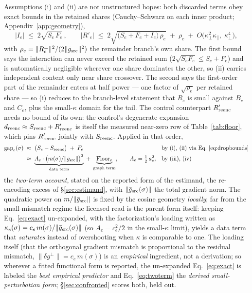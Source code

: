 Assumptions (i) and (ii) are not unstructured hopes: both discarded
terms obey exact bounds in the retained shares
(Cauchy--Schwarz on each inner product; Appendix~\ref{app:geometry}),
\begin{equation}
|I_e| \;\le\; 2\sqrt{S_e\,F_e}\,,
\qquad
\big|R'_e\big| \;\le\; 2\sqrt{\big(S_e + F_e + I_e\big)\,\rho_e}
\;+\; \rho_e
\;+\; O\big(\kappa_\perp^2\kappa_\parallel,\; \kappa_\perp^4\big),
\label{eq:dropbounds}
\end{equation}
with $\rho_e = \|R_e^{\perp}\|^2 / (2\|\bar g_{\mathrm{src}}\|^2)$ the
remainder branch's own share. The first bound says the interaction can
never exceed the retained sum ($2\sqrt{S_eF_e} \le S_e + F_e$) and is
automatically negligible wherever one share dominates the other, so
(ii) carries independent content only near share crossover. The second
says the first-order part of the remainder enters at half power ---
one factor of $\sqrt{\rho_e}$ per retained share --- so (i) reduces to
the branch-level statement that $R_e$ is small against $B_e$ and
$C_e$, plus the small-$\kappa$ domain for the tail. The control
counterpart $R'_{\mathrm{reenc}}$ needs no bound of its own: the control's
degenerate expansion $d_{\mathrm{reenc}} \approx S_{\mathrm{reenc}} + R'_{\mathrm{reenc}}$ is
itself the measured near-zero row of Table~\ref{tab:floor}, which pins
$R'_{\mathrm{reenc}}$ jointly with $S_{\mathrm{reenc}}$.
Applied in that order,
\begin{align}
\mathrm{gap}_e(\sigma)
\;&\approx\; \big(S_e - S_{\mathrm{reenc}}\big) \;+\; F_e
&&\text{by (i), (ii) via Eq.~\ref{eq:dropbounds}}
\nonumber\\
\;&\approx\;
\underbrace{A_e \cdot \big(m(\sigma)/\|\bar g_{\mathrm{src}}\|\big)^{2}}_{\text{data term}}
\;+\; \underbrace{\mathrm{Floor}_e}_{\text{graph term}},
\qquad A_e = \tfrac{1}{2}\,a_e^2,
&&\text{by (iii), (iv)}
\label{eq:twoterm}
\end{align}
the \emph{two-term account}, stated on the reported form of the
estimand, the re-encoding excess of \S\ref{sec:estimand}, with
$\|\bar g_{\mathrm{src}}(\sigma)\|$ the total gradient norm. The
quadratic power on $m/\|\bar g_{\mathrm{src}}\|$ is fixed by the cosine geometry \emph{locally};
far from the small-mismatch regime the licensed read is the parent form
itself: keeping Eq.~\ref{eq:exact} un-expanded, with the factorization's loading
written as $\kappa_e(\sigma) = c_e \, m(\sigma)/\|\bar g_{\mathrm{src}}(\sigma)\|$ (so
$A_e = c_e^2/2$ in the small-$\kappa$ limit), yields a data term that
\emph{saturates} instead of overshooting when $\kappa$ is comparable to
one. The loading itself (that the orthogonal gradient mismatch is
proportional to the residual mismatch, $\|\delta g^{\perp}\| =
c_e\, m(\sigma)$) is an \emph{empirical} ingredient, not a
derivation; so wherever a fitted functional form is reported, the
un-expanded Eq.~\ref{eq:exact} is labeled the \emph{best empirical
predictor} and Eq.~\ref{eq:twoterm} the \emph{derived
small-perturbation form}; \S\ref{sec:confronted} scores both, held
out.

